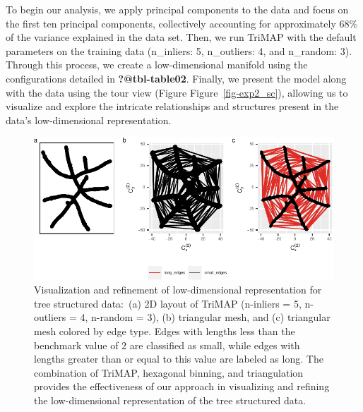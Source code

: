 \documentclass[
  12pt]{article}
\begin{document}
To begin our analysis, we apply principal components to the data and
focus on the first ten principal components, collectively accounting for
approximately 68\% of the variance explained in the data set. Then, we
run TriMAP with the default parameters on the training data (n\_inliers:
5, n\_outliers: 4, and n\_random: 3). Through this process, we create a
low-dimensional manifold using the configurations detailed in
\textbf{?@tbl-table02}. Finally, we present the model along with the
data using the tour view (Figure Figure~\ref{fig-exp2_sc}), allowing us
to visualize and explore the intricate relationships and structures
present in the data's low-dimensional representation.

\begin{figure}[H]

{\centering \includegraphics[width=1\textwidth,height=\textheight]{paper_files/figure-pdf/fig-example2-1.pdf}

}

\caption{\label{fig-example2}Visualization and refinement of
low-dimensional representation for tree structured data\(\colon\) (a) 2D
layout of TriMAP (n-inliers = 5, n-outliers = 4, n-random = 3), (b)
triangular mesh, and (c) triangular mesh colored by edge type. Edges
with lengths less than the benchmark value of \(2\) are classified as
small, while edges with lengths greater than or equal to this value are
labeled as long. The combination of TriMAP, hexagonal binning, and
triangulation provides the effectiveness of our approach in visualizing
and refining the low-dimensional representation of the tree structured
data.}

\end{figure}
\end{document}
